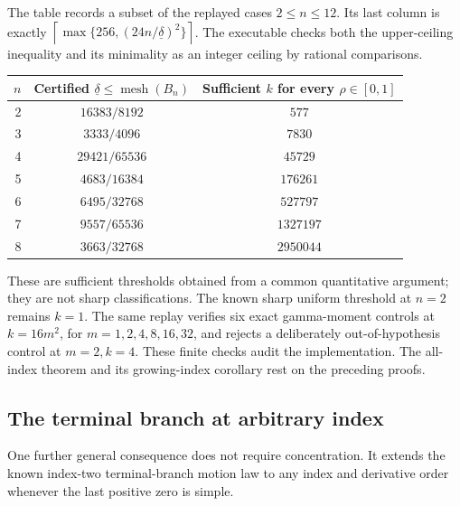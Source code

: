 The table records a subset of the replayed cases $2\leq n\leq12$.
Its last column is exactly
$\left\lceil\max\{256,(24n/\underline\delta)^2\}\right\rceil$.
The executable checks both the upper-ceiling inequality and its minimality
as an integer ceiling by rational comparisons.
\begin{center}
\begin{tabular}{rcc}
\hline
$n$ & Certified $\underline\delta\leq\operatorname{mesh}(B_n)$
 & Sufficient $k$ for every $\rho\in[0,1]$\\
\hline
2 & $16383/8192$ & $577$\\
3 & $3333/4096$ & $7830$\\
4 & $29421/65536$ & $45729$\\
5 & $4683/16384$ & $176261$\\
6 & $6495/32768$ & $527797$\\
7 & $9557/65536$ & $1327197$\\
8 & $3663/32768$ & $2950044$\\
\hline
\end{tabular}
\end{center}
These are sufficient thresholds obtained from a common quantitative
argument; they are not sharp classifications.  The known sharp uniform
threshold at $n=2$ remains $k=1$.  The same replay verifies six exact
gamma-moment controls at $k=16m^2$, for $m=1,2,4,8,16,32$, and rejects
a deliberately out-of-hypothesis control at $m=2,k=4$.
These finite checks audit the implementation.  The all-index theorem
and its growing-index corollary rest on the preceding proofs.

\subsection{The terminal branch at arbitrary index}

One further general consequence does not require concentration.  It
extends the known index-two terminal-branch motion law to any index and
derivative order whenever the last positive zero is simple.

